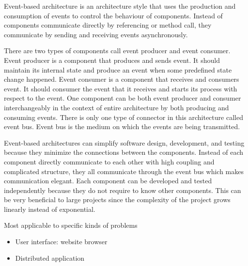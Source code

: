 \begin{summary}
Event-based architecture is an architecture style that uses the production and
consumption of events to control the behaviour of components. Instead of
components communicate directly by referencing or method call, they communicate
by sending and receiving events asynchronously.

There are two types of components call event producer and event consumer. Event
producer is a component that produces and sends event. It should maintain its
internal state and produce an event when some predefined state change happened.
Event  consumer is a component that receives and consumers event. It should
consumer the event that it receives and starts its process with respect to the
event. One component can be both event producer and consumer interchangeably in
the context of entire architecture by both producing and consuming events.
There is only one type of connector in this architecture called event bus.
Event bus is the medium on which the events are being transmitted.

Event-based architectures can simplify software design, development, and
testing because they minimize the connections between the components. Instead
of each component directly communicate to each other with high coupling and
complicated structure, they all communicate through the event bus which makes
communication elegant. Each component can be developed and tested independently
because they do not require to know other components. This can be very
beneficial to large projects since the complexity of the project grows linearly
instead of exponential.

Most applicable to specific kinds of problems \begin{itemize}[noitemsep]
    \item User interface: website browser
    \item Distributed application
\end{itemize}

\end{summary}



